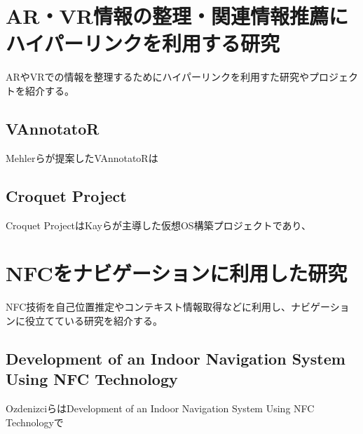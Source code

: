 \section{AR・VR情報の整理・関連情報推薦にハイパーリンクを利用する研究}
ARやVRでの情報を整理するためにハイパーリンクを利用すた研究やプロジェクトを紹介する。

\subsection{VAnnotatoR}
Mehlerらが提案したVAnnotatoR\cite{10.1145/3209542.3209572}は

\subsection{Croquet Project}
Croquet Project\cite{10.1145/1152399.1152452}はKayらが主導した仮想OS構築プロジェクトであり、


\section{NFCをナビゲーションに利用した研究}
NFC技術を自己位置推定やコンテキスト情報取得などに利用し、ナビゲーションに役立てている研究を紹介する。

\subsection{Development of an Indoor Navigation System Using NFC Technology}
OzdenizciらはDevelopment of an Indoor Navigation System Using NFC Technology\cite{5954491}で